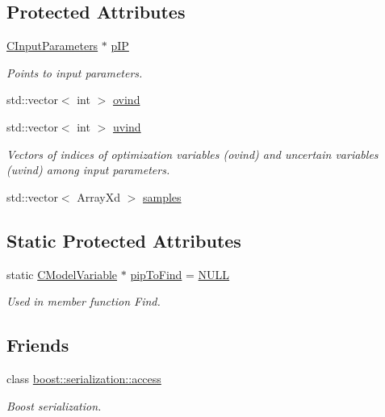 \subsection*{Protected Attributes}
\begin{DoxyCompactItemize}
\item 
\hyperlink{class_go_s_u_m_1_1_c_input_parameters}{C\-Input\-Parameters} $\ast$ \hyperlink{class_go_s_u_m_1_1_c_simple_optimization_problem_a6163e020d2c137adb71e449c73780a51}{p\-I\-P}
\begin{DoxyCompactList}\small\item\em Points to input parameters. \end{DoxyCompactList}\item 
std\-::vector$<$ int $>$ \hyperlink{class_go_s_u_m_1_1_c_simple_optimization_problem_abe82037eb165ad085057b12b32886d8d}{ovind}
\item 
std\-::vector$<$ int $>$ \hyperlink{class_go_s_u_m_1_1_c_simple_optimization_problem_acddbd19e980f3afb8eb0113dfbcc21a1}{uvind}
\begin{DoxyCompactList}\small\item\em Vectors of indices of optimization variables (ovind) and uncertain variables (uvind) among input parameters. \end{DoxyCompactList}\item 
std\-::vector$<$ Array\-Xd $>$ \hyperlink{class_go_s_u_m_1_1_c_simple_optimization_problem_acb6bedecb1d9856dba7d3aafa41e5738}{samples}
\end{DoxyCompactItemize}
\subsection*{Static Protected Attributes}
\begin{DoxyCompactItemize}
\item 
static \hyperlink{class_go_s_u_m_1_1_c_model_variable}{C\-Model\-Variable} $\ast$ \hyperlink{class_go_s_u_m_1_1_c_simple_optimization_problem_a5aefa2b214c065e7844b1316f6c38aba}{pip\-To\-Find} = \hyperlink{struct_go_s_u_m_a3e6605d298c4dcd991f606a654a6cae4}{N\-U\-L\-L}
\begin{DoxyCompactList}\small\item\em Used in member function Find. \end{DoxyCompactList}\end{DoxyCompactItemize}
\subsection*{Friends}
\begin{DoxyCompactItemize}
\item 
class \hyperlink{class_go_s_u_m_1_1_c_simple_optimization_problem_ac98d07dd8f7b70e16ccb9a01abf56b9c}{boost\-::serialization\-::access}
\begin{DoxyCompactList}\small\item\em Boost serialization. \end{DoxyCompactList}\end{DoxyCompactItemize}
